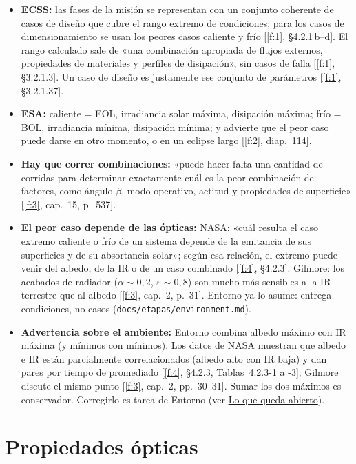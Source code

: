 \documentclass[11pt,a4paper]{article}
\newcommand{\code}[1]{\texttt{#1}}
\newcommand{\f}[1]{\ref{f:#1}}
\begin{document}
\begin{itemize}
  \item \textbf{ECSS:} las fases de la misión se representan con un conjunto coherente de casos de diseño que cubre el rango extremo de condiciones; para los casos de dimensionamiento se usan los peores casos caliente y frío [\f{1}, §4.2.1\,b--d]. El rango calculado sale de «una combinación apropiada de flujos externos, propiedades de materiales y perfiles de disipación», sin casos de falla [\f{1}, §3.2.1.3]. Un caso de diseño es justamente ese conjunto de parámetros [\f{1}, §3.2.1.37].
  \item \textbf{ESA:} caliente = EOL, irradiancia solar máxima, disipación máxima; frío = BOL, irradiancia mínima, disipación mínima; y advierte que el peor caso puede darse en otro momento, o en un eclipse largo [\f{2}, diap.~114].
  \item \textbf{Hay que correr combinaciones:} «puede hacer falta una cantidad de corridas para determinar exactamente cuál es la peor combinación de factores, como ángulo $\beta$, modo operativo, actitud y propiedades de superficie» [\f{3}, cap.~15, p.~537].
  \item \textbf{El peor caso depende de las ópticas:} NASA: «cuál resulta el caso extremo caliente o frío de un sistema depende de la emitancia de sus superficies y de su absortancia solar»; según esa relación, el extremo puede venir del albedo, de la IR o de un caso combinado [\f{4}, §4.2.3]. Gilmore: los acabados de radiador ($\alpha \sim 0{,}2$, $\varepsilon \sim 0{,}8$) son mucho más sensibles a la IR terrestre que al albedo [\f{3}, cap.~2, p.~31]. Entorno ya lo asume: entrega condiciones, no casos (\code{docs/etapas/environment.md}).
  \item \textbf{Advertencia sobre el ambiente:} Entorno combina albedo máximo con IR máxima (y mínimos con mínimos). Los datos de NASA muestran que albedo e IR están parcialmente correlacionados (albedo alto con IR baja) y dan pares por tiempo de promediado [\f{4}, §4.2.3, Tablas~4.2.3-1 a -3]; Gilmore discute el mismo punto [\f{3}, cap.~2, pp.~30--31]. Sumar los dos máximos es conservador. Corregirlo es tarea de Entorno (ver \hyperref[sec:abierto]{Lo que queda abierto}).
\end{itemize}

\section{Propiedades ópticas}\label{sec:opticas}
\end{document}
